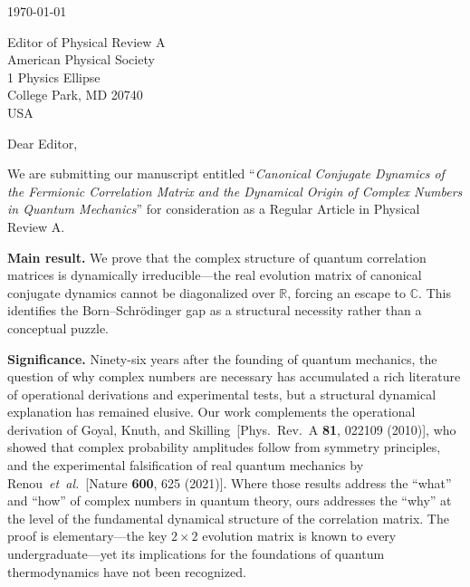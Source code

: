 \documentclass[aps,pra,preprint]{revtex4-2}
\begin{document}
\noindent \today

\vspace{2em}

\noindent Editor of Physical Review A\\
American Physical Society\\
1 Physics Ellipse\\
College Park, MD 20740\\
USA

\vspace{2em}

\noindent Dear Editor,

\vspace{1em}

\noindent
We are submitting our manuscript entitled
``\textit{Canonical Conjugate Dynamics of the Fermionic Correlation Matrix
and the Dynamical Origin of Complex Numbers in Quantum Mechanics}''
for consideration as a Regular Article in Physical Review A.

\vspace{1em}

\noindent
\textbf{Main result.}
We prove that the complex structure of quantum correlation matrices
is dynamically irreducible---the real evolution matrix of canonical
conjugate dynamics cannot be diagonalized over $\mathbb{R}$, forcing
an escape to $\mathbb{C}$. This identifies the Born--Schr\"odinger
gap as a structural necessity rather than a conceptual puzzle.

\vspace{1em}

\noindent
\textbf{Significance.}
Ninety-six years after the founding of quantum mechanics, the question
of why complex numbers are necessary has accumulated a rich literature
of operational derivations and experimental tests, but a structural
dynamical explanation has remained elusive. Our work complements the
operational derivation of Goyal, Knuth, and Skilling~[Phys.\ Rev.\ A
\textbf{81}, 022109 (2010)], who showed that complex probability
amplitudes follow from symmetry principles, and the experimental
falsification of real quantum mechanics by Renou~\textit{et~al.}~[Nature
\textbf{600}, 625 (2021)]. Where those results address the ``what'' and
``how'' of complex numbers in quantum theory, ours addresses the
``why'' at the level of the fundamental dynamical structure of the
correlation matrix. The proof is elementary---the key $2\times2$
evolution matrix is known to every undergraduate---yet its implications
for the foundations of quantum thermodynamics have not been recognized.
\end{document}
